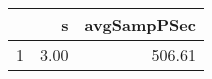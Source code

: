 \begin{table}[h]
\centering
\begin{tabular}{rrr}
  \hline
 & s & avgSampPSec \\ 
  \hline
1 & 3.00 & 506.61 \\ 
   \hline
\end{tabular}
\end{table}
